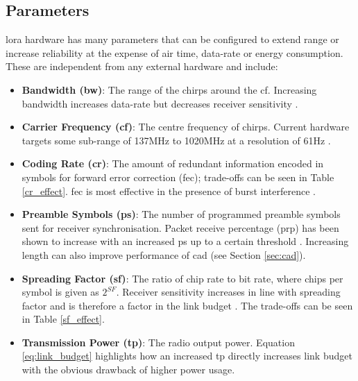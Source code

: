 \subsection{Parameters}
\ac{lora} hardware has many parameters that can be configured to extend range or increase reliability at the expense of air time, data-rate or energy consumption. These are independent from any external hardware and include:
\begin{itemize}
    \item \textbf{Bandwidth (\ac{bw})}: The range of the chirps around the \ac{cf}. Increasing bandwidth increases data-rate but decreases receiver sensitivity \cite{3YP:STUDY_OF_LORA}.
    \item \textbf{Carrier Frequency (\ac{cf})}: The centre frequency of chirps. Current hardware targets some sub-range of 137MHz to 1020MHz at a resolution of 61Hz \cite{3YP:LORA_SX12}. 
    \item \textbf{Coding Rate (\ac{cr})}: The amount of redundant information encoded in symbols for forward error correction (\ac{fec}); trade-offs can be seen in Table \ref{cr_effect}. \ac{fec} is most effective in the presence of burst interference \cite{3YP:LORA_MOD_BASICS}.
    \item \textbf{Preamble Symbols (\ac{ps})}: The number of programmed preamble symbols sent for receiver synchronisation. Packet receive percentage (\ac{prp}) has been shown to increase with an increased \ac{ps} up to a certain threshold \cite{3YP:LORA_PERFORMANCE}. Increasing length can also improve performance of \ac{cad} (see Section \ref{sec:cad}).
    \item \textbf{Spreading Factor (\ac{sf})}: The ratio of chip rate to bit rate, where chips per symbol is given as $2^{SF}$. Receiver sensitivity increases in line with spreading factor and is therefore a factor in the link budget \cite{3YP:LORA_SX12}. The trade-offs can be seen in Table \ref{sf_effect}.
    \item \textbf{Transmission Power (\ac{tp})}: The radio output power. Equation \ref{eq:link_budget} highlights how an increased \ac{tp} directly increases link budget with the obvious drawback of higher power usage. 
\end{itemize}


